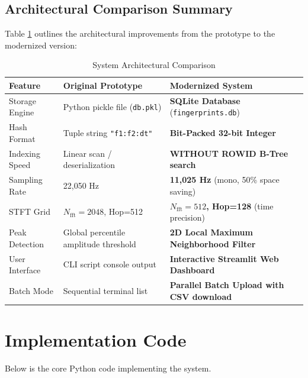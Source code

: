 \documentclass[11pt,a4paper]{article}
\begin{document}
\subsection{Architectural Comparison Summary}
Table \ref{tab:comparison} outlines the architectural improvements from the prototype to the modernized version:

\begin{table}[H]
    \centering
    \caption{System Architectural Comparison}
    \label{tab:comparison}
    \begin{tabularx}{\textwidth}{lXX}
        \toprule
        \textbf{Feature} & \textbf{Original Prototype} & \textbf{Modernized System} \\
        \midrule
        Storage Engine & Python pickle file (\texttt{db.pkl}) & \textbf{SQLite Database} (\texttt{fingerprints.db}) \\
        Hash Format & Tuple string \texttt{"f1:f2:dt"} & \textbf{Bit-Packed 32-bit Integer} \\
        Indexing Speed & Linear scan / deserialization & \textbf{WITHOUT ROWID B-Tree search} \\
        Sampling Rate & 22,050 Hz & \textbf{11,025 Hz} (mono, 50\% space saving) \\
        STFT Grid & $N_{\text{fft}}=2048$, Hop=512 & \textbf{$N_{\text{fft}}=512$, Hop=128} (time precision) \\
        Peak Detection & Global percentile amplitude threshold & \textbf{2D Local Maximum Neighborhood Filter} \\
        User Interface & CLI script console output & \textbf{Interactive Streamlit Web Dashboard} \\
        Batch Mode & Sequential terminal list & \textbf{Parallel Batch Upload with CSV download} \\
        \bottomrule
    \end{tabularx}
\end{table}



\section{Implementation Code}
Below is the core Python code implementing the system.
\end{document}

